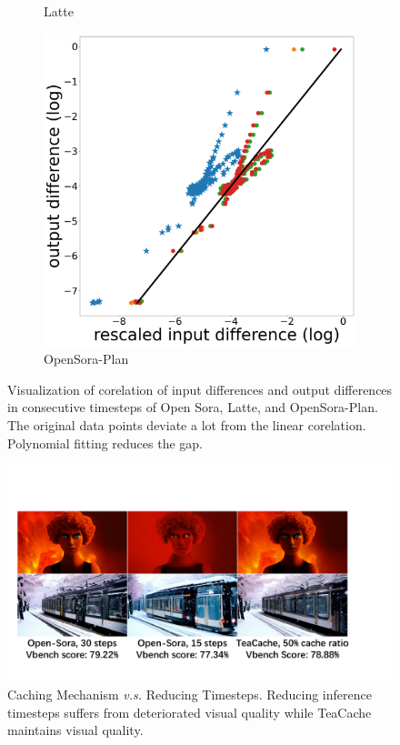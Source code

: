 \begin{figure}
\begin{minipage}{0.8\textwidth}
\begin{subfigure}{0.3\textwidth}
        \caption{Latte}
    \end{subfigure}
    \hfill
    \begin{subfigure}{0.3\textwidth}
        \centering
        \includegraphics[width=\textwidth]{figs/opensora_plan_inference_fit_log_3.png}
        \caption{OpenSora-Plan}
    \end{subfigure}
    \end{minipage}
    \vspace{-0.2cm}
    \caption{Visualization of corelation of input differences and output differences in consecutive timesteps of Open Sora, Latte, and OpenSora-Plan. 
    The original data points deviate a lot from the linear corelation. Polynomial fitting reduces the gap.}
    \label{fig:fitting}
\end{figure}

\begin{figure}
  \centering
    \includegraphics[width=1.0\linewidth]{figs/reducing_steps.pdf}
  \caption{Caching Mechanism \textit{v.s.} Reducing Timesteps. Reducing inference timesteps suffers from deteriorated visual quality while TeaCache maintains visual quality.}
  \label{fig:few timestep}
\end{figure}

